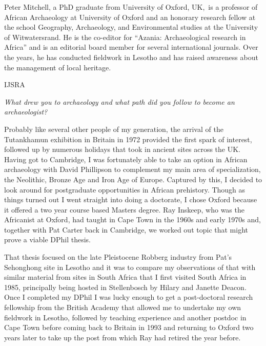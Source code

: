 \IJSRAseparator
{}
{\sffamily Peter Mitchell, a PhD graduate from University of Oxford, UK, is a professor of African Archaeology at University of Oxford and an honorary research fellow at the school Geography, Archaeology, and Environmental studies at the University of Witwatersrand. He is the co-editor for “Azania: Archaeological research in Africa” and is an editorial board member for several international journals. Over the years, he has conducted fieldwork in Lesotho and has raised awareness about the management of local heritage. }
\begin{labeling}{IJSRA}	

\item[IJSRA (International Journal of Student Research in Archaeology)] \emph{What drew you to archaeology and what path did you follow to become an archaeologist?}
	
\item[Peter Mitchell (PM)] Probably like several other people of my generation, the arrival of the Tutankhamun exhibition in Britain in 1972 provided the first spark of interest, followed up by numerous holidays that took in ancient sites across the UK. Having got to Cambridge, I was fortunately able to take an option in African archaeology with David Phillipson to complement my main area of specialization, the Neolithic, Bronze Age and Iron Age of Europe. Captured by this, I decided to look around for postgraduate opportunities in African prehistory. Though as things turned out I went straight into doing a doctorate, I chose Oxford because it offered a two year course based Masters degree. Ray Inskeep, who was the Africanist at Oxford, had taught in Cape Town in the 1960s and early 1970s and, together with Pat Carter back in Cambridge, we worked out topic that might prove a viable DPhil thesis.

That thesis focused on the late Pleistocene Robberg industry from Pat’s Sehonghong site in Lesotho and it was to compare my observations of that with similar material from sites in South Africa that I first visited South Africa in 1985, principally being hosted in Stellenbosch by Hilary and Janette Deacon. Once I completed my DPhil I was lucky enough to get a post-doctoral research fellowship from the British Academy that allowed me to undertake my own fieldwork in Lesotho, followed by teaching experience and another postdoc in Cape Town before coming back to Britain in 1993 and returning to Oxford two years later to take up the post from which Ray had retired the year before.



\end{labeling}
